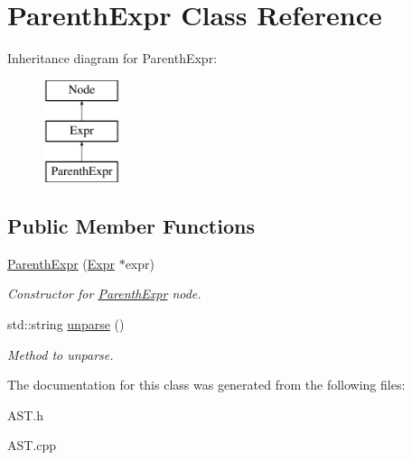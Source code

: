 \hypertarget{classParenthExpr}{\section{Parenth\-Expr Class Reference}
\label{classParenthExpr}
}
Inheritance diagram for Parenth\-Expr\-:\begin{figure}[H]
\begin{center}
\leavevmode
\includegraphics[height=3.000000cm]{classParenthExpr}
\end{center}
\end{figure}
\subsection*{Public Member Functions}
\begin{DoxyCompactItemize}
\item 
\hypertarget{classParenthExpr_a419bdc27ef45e7cf4eddff0c545eb576}{\hyperlink{classParenthExpr_a419bdc27ef45e7cf4eddff0c545eb576}{Parenth\-Expr} (\hyperlink{classExpr}{Expr} $\ast$expr)}\label{classParenthExpr_a419bdc27ef45e7cf4eddff0c545eb576}

\begin{DoxyCompactList}\small\item\em Constructor for \hyperlink{classParenthExpr}{Parenth\-Expr} node. \end{DoxyCompactList}\item 
\hypertarget{classParenthExpr_a94060c2cb0d2b81cf4d64b6a7b1bbe40}{std\-::string \hyperlink{classParenthExpr_a94060c2cb0d2b81cf4d64b6a7b1bbe40}{unparse} ()}\label{classParenthExpr_a94060c2cb0d2b81cf4d64b6a7b1bbe40}

\begin{DoxyCompactList}\small\item\em Method to unparse. \end{DoxyCompactList}\end{DoxyCompactItemize}


The documentation for this class was generated from the following files\-:\begin{DoxyCompactItemize}
\item 
A\-S\-T.\-h\item 
A\-S\-T.\-cpp\end{DoxyCompactItemize}
